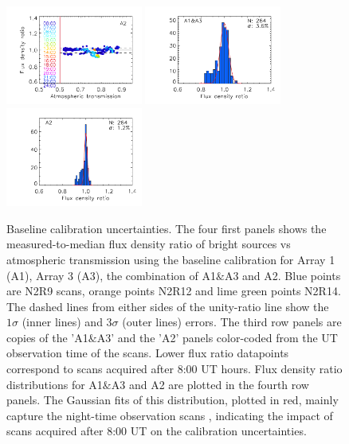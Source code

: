 \begin{figure}[ht!]
\begin{center}
    \includegraphics[clip=true, trim={0.9cm, 0.2cm, 0, 0.6cm},width=0.4\textwidth]{Figures/Calibration/plot_flux_density_ratio_obstau_allbright_obsdate_corrected_skydip_narrow_a2.pdf}
    \includegraphics[clip=true, trim={0.9cm, 0.2cm, 0, 0.6cm},width=0.4\textwidth]{Figures/Calibration/plot_histo_flux_density_ratio_obstau_allbright_corrected_skydip_narrow_1mm.pdf}
    \includegraphics[clip=true, trim={0.9cm, 0.2cm, 0, 0.6cm},width=0.4\textwidth]{Figures/Calibration/plot_histo_flux_density_ratio_obstau_allbright_corrected_skydip_narrow_a2.pdf}  
    \caption[Baseline calibration rms error estimate]{Baseline
      calibration uncertainties. The four first panels shows the
      measured-to-median flux density ratio of bright sources vs
      atmospheric transmission using the baseline calibration for
      Array 1 (A1), Array 3 (A3), the combination of A1$\&$A3 and
      A2. Blue points are N2R9 scans, orange points N2R12 and lime
      green points N2R14. The dashed lines from either sides of the
      unity-ratio line
      show the $1\sigma$ (inner lines) and $3\sigma$ (outer lines) errors.
      The third row panels are copies of the 'A1$\&$A3' and the
      'A2' panels color-coded from the UT observation time of the
      scans. Lower flux ratio datapoints correspond to
      scans acquired after 8:00 UT hours. Flux density ratio
      distributions for A1$\&$A3 and A2 are plotted in the fourth row
      panels. The Gaussian fits of this distribution, plotted in red,
      mainly capture the
      night-time observation scans%
      , indicating the
      impact of scans acquired after 8:00 UT on the calibration
      uncertainties.}
    \label{fig:allbright_rms_corrected_skydip}
  \end{center}
\end{figure}


